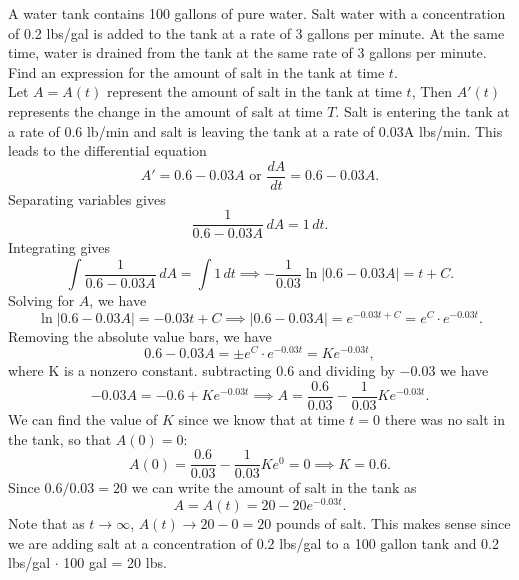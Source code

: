 \documentclass[handout]{ximera}
\begin{document}
\begin{example}[example 6]
A water tank contains 100 gallons of pure water. Salt water with a concentration of 0.2 lbs/gal is added to the tank at a rate of 3 gallons per minute.
At the same time, water is drained from the tank at the same rate of 3 gallons per minute.
Find an expression for the amount of salt in the tank at time $t$.\\
Let $A = A(t)$ represent the amount of salt in the tank at time $t$, Then $A'(t)$ represents the change in the amount of salt at time $T$. Salt is entering the tank at a rate of 0.6 lb/min and 
salt is leaving the tank at a rate of 0.03A lbs/min. This leads to the differential equation
\[
A' = 0.6 - 0.03A \text{  or  } \frac{dA}{dt} = 0.6 - 0.03A.
\]
Separating variables gives
\[
\frac{1}{0.6 -0.03A} \, dA = 1\, dt.
\]
Integrating gives
\[
\int \frac{1}{0.6 -0.03A} \, dA = \int 1 \, dt \implies -\frac{1}{0.03}\ln|0.6 - 0.03A|  = t + C.
\]
Solving for $A$, we have
\[
\ln|0.6 - 0.03A|  = -0.03t + C \implies |0.6-0.03A| = e^{-0.03t + C} = e^C \cdot e^{-0.03t}.
\]
Removing the absolute value bars, we have
\[
0.6 - 0.03A = \pm e^C \cdot e^{-0.03t} = Ke^{-0.03t},
\]
where K is a nonzero constant.
subtracting $0.6$ and dividing by $-0.03$ we have 
\[
-0.03A = -0.6 + Ke^{-0.03t} \implies A = \frac{0.6}{0.03} - \frac{1}{0.03}Ke^{-0.03t}.
\]
We can find the value of $K$ since we know that at time $t = 0$ there was no salt in the tank, so that $A(0) = 0$:
\[
A(0) = \frac{0.6}{0.03} - \frac{1}{0.03}Ke^0 = 0 \implies  K = 0.6.
\]
Since $0.6/0.03 = 20$ we can write the amount of salt in the tank as
\[
A= A(t) = 20 - 20e^{-0.03t}.
\]
Note that as $t\to \infty$, $A(t) \to 20 - 0 = 20$ pounds of salt. 
This makes sense since we are adding salt at a concentration of 0.2 lbs/gal to a 100 gallon tank and 0.2 lbs/gal $\cdot$ 100 gal = 20 lbs.
\end{example}
\end{document}
